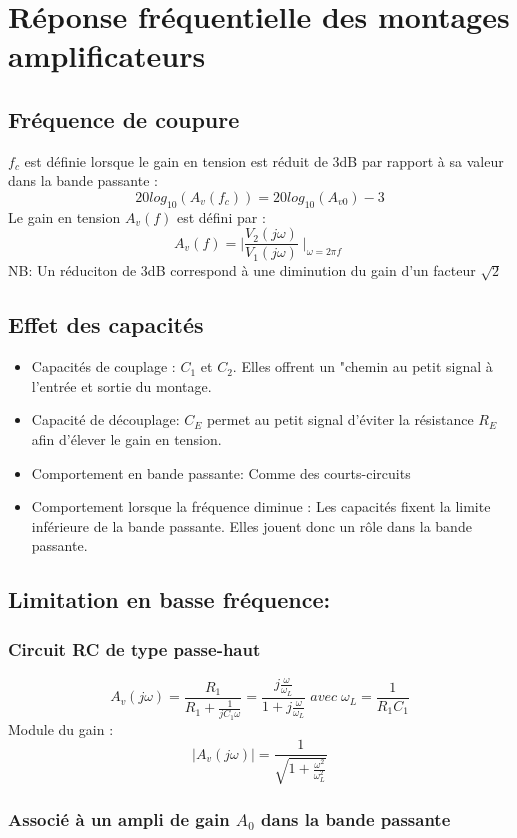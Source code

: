 \documentclass[]{article}
\begin{document}
\section{Réponse fréquentielle des montages amplificateurs}
\subsection{Fréquence de coupure}
$f_c$ est définie lorsque le gain en tension est réduit de 3dB par rapport à sa valeur dans la bande passante :
$$ 20 log_{10}(A_v(f_c)) = 20log_{10}(A_{v0}) - 3 $$
Le gain en tension $A_v(f)$ est défini par :
$$ A_v(f) = \mid \frac{V_2(j\omega)}{V_1(j\omega)} \mid_{\omega = 2\pi f}  $$
NB: Un réduciton de 3dB correspond à une diminution du gain d'un facteur $\sqrt{2}$

\subsection{Effet des capacités}

\begin{itemize}
\item{Capacités de couplage :} $C_1$ et $C_2$. Elles offrent un "chemin au petit signal à l'entrée et sortie du montage.
\item{Capacité de découplage:} $C_E$ permet au petit signal d'éviter la résistance $R_E$ afin d'élever le gain en tension.
\item{Comportement en bande passante:} Comme des courts-circuits
\item{Comportement lorsque la fréquence diminue :} Les capacités fixent la limite inférieure de la bande passante. Elles jouent donc un rôle dans la bande passante.
\end{itemize}

\subsection{Limitation en basse fréquence:}
\subsubsection{Circuit RC de type passe-haut}
$$ A_v(j\omega) = \frac{R_1}{R_1 + \frac{1}{jC_1\omega}} = \frac{j\frac{\omega}{\omega_L}}{1+j\frac{\omega}{\omega_L}} \; avec \; \omega_L = \frac{1}{R_1C_1} $$
Module du gain : $$ \mid A_v(j\omega) \mid = \frac{1}{\sqrt{1+\frac{\omega^2}{\omega_L^2}}}  $$

\subsubsection{Associé à un ampli de gain $A_0$ dans la bande passante}
\end{document}
